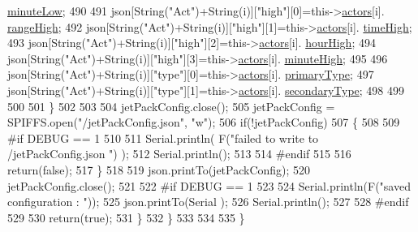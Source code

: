 \begin{DoxyCode}
      \hyperlink{struct_jetpack_1_1state_aa699e25d802a00e86d3a8032ec48b88b}{minuteLow};
490 
491                 json[String(\textcolor{stringliteral}{"Act"})+String(i)][\textcolor{stringliteral}{"high"}][0]=this->\hyperlink{class_jetpack_a7e16d2f97837f9712a2e6de1c50d99db}{actors}[i].
      \hyperlink{struct_jetpack_1_1state_ae330612c3da637654ecfa89d36620b93}{rangeHigh};
492                 json[String(\textcolor{stringliteral}{"Act"})+String(i)][\textcolor{stringliteral}{"high"}][1]=this->\hyperlink{class_jetpack_a7e16d2f97837f9712a2e6de1c50d99db}{actors}[i].
      \hyperlink{struct_jetpack_1_1state_a97c594b20b03b46ae0a6ac544f5d6c8d}{timeHigh};
493                 json[String(\textcolor{stringliteral}{"Act"})+String(i)][\textcolor{stringliteral}{"high"}][2]=this->\hyperlink{class_jetpack_a7e16d2f97837f9712a2e6de1c50d99db}{actors}[i].
      \hyperlink{struct_jetpack_1_1state_ace824f4ae57fa1a4a27b2c6477b350e3}{hourHigh};
494                 json[String(\textcolor{stringliteral}{"Act"})+String(i)][\textcolor{stringliteral}{"high"}][3]=this->\hyperlink{class_jetpack_a7e16d2f97837f9712a2e6de1c50d99db}{actors}[i].
      \hyperlink{struct_jetpack_1_1state_a8c26c18b0ec449b7545934cb01cca028}{minuteHigh};
495 
496                 json[String(\textcolor{stringliteral}{"Act"})+String(i)][\textcolor{stringliteral}{"type"}][0]=this->\hyperlink{class_jetpack_a7e16d2f97837f9712a2e6de1c50d99db}{actors}[i].
      \hyperlink{struct_jetpack_1_1state_aa6242c32eb0ab42aaea170636ab949e1}{primaryType};
497                 json[String(\textcolor{stringliteral}{"Act"})+String(i)][\textcolor{stringliteral}{"type"}][1]=this->\hyperlink{class_jetpack_a7e16d2f97837f9712a2e6de1c50d99db}{actors}[i].
      \hyperlink{struct_jetpack_1_1state_a81cf9af139da095b7d91e2a87e50135b}{secondaryType};
498 
499 
500 
501             \}
502             
503 
504             jetPackConfig.close();          
505             jetPackConfig = SPIFFS.open(\textcolor{stringliteral}{"/jetPackConfig.json"}, \textcolor{stringliteral}{"w"});            
506             \textcolor{keywordflow}{if}(!jetPackConfig)
507             \{
508             
509 \textcolor{preprocessor}{            #if DEBUG == 1 }
510 
511                 Serial.println( F(\textcolor{stringliteral}{"failed to write to /jetPackConfig.json "}) );
512                 Serial.println();
513             
514 \textcolor{preprocessor}{            #endif}
515                 
516                 \textcolor{keywordflow}{return}(\textcolor{keyword}{false});          
517             \}  
518 
519             json.printTo(jetPackConfig);
520             jetPackConfig.close();
521 
522 \textcolor{preprocessor}{        #if DEBUG == 1 }
523             
524             Serial.println(F(\textcolor{stringliteral}{"saved configuration : "}));
525             json.printTo(Serial );
526             Serial.println();       
527         
528 \textcolor{preprocessor}{        #endif}
529 
530             \textcolor{keywordflow}{return}(\textcolor{keyword}{true}); 
531         \}
532     \}   
533     
534 
535 \}
\end{DoxyCode}
